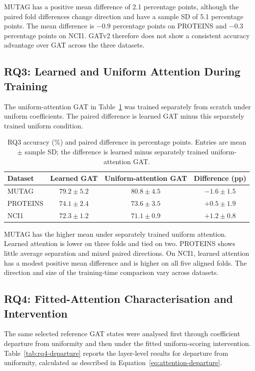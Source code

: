 \documentclass[11pt,a4paper]{article}
\begin{document}
MUTAG has a positive mean difference of 2.1 percentage points, although the paired fold differences change direction and have a sample SD of 5.1 percentage points. The mean difference is \(-0.9\) percentage points on PROTEINS and \(-0.3\) percentage points on NCI1. GATv2 therefore does not show a consistent accuracy advantage over GAT across the three datasets.

\subsection{RQ3: Learned and Uniform Attention During Training}
\label{sec:results-rq3}

The uniform-attention GAT in Table~\ref{tab:rq3-results} was trained separately from scratch under uniform coefficients. The paired difference is learned GAT minus this separately trained uniform condition.

\begin{table}[!ht]
\centering
\caption{RQ3 accuracy (\%) and paired difference in percentage points. Entries are mean \(\pm\) sample SD; the difference is learned minus separately trained uniform-attention GAT.}
\label{tab:rq3-results}
\begin{tabular}{@{}lccc@{}}
\toprule
Dataset & Learned GAT & Uniform-attention GAT & Difference (pp)\\
\midrule
MUTAG & \(79.2\pm5.2\) & \(80.8\pm4.5\) & \(-1.6\pm1.5\)\\
PROTEINS & \(74.1\pm2.4\) & \(73.6\pm3.5\) & \(+0.5\pm1.9\)\\
NCI1 & \(72.3\pm1.2\) & \(71.1\pm0.9\) & \(+1.2\pm0.8\)\\
\bottomrule
\end{tabular}
\end{table}

MUTAG has the higher mean under separately trained uniform attention. Learned attention is lower on three folds and tied on two. PROTEINS shows little average separation and mixed paired directions. On NCI1, learned attention has a modest positive mean difference and is higher on all five aligned folds. The direction and size of the training-time comparison vary across datasets.

\clearpage
\subsection{RQ4: Fitted-Attention Characterisation and Intervention}
\label{sec:results-rq4}

The same selected reference GAT states were analysed first through coefficient departure from uniformity and then under the fitted uniform-scoring intervention. Table~\ref{tab:rq4-departure} reports the layer-level results for departure from uniformity, calculated as described in Equation~\eqref{eq:attention-departure}.
\end{document}
